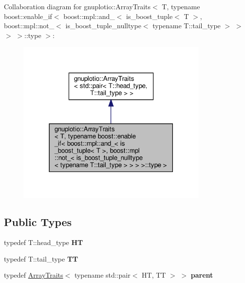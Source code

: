 Collaboration diagram for gnuplotio\+:\+:Array\+Traits$<$ T, typename boost\+:\+:enable\+\_\+if$<$ boost\+:\+:mpl\+:\+:and\+\_\+$<$ is\+\_\+boost\+\_\+tuple$<$ T $>$, boost\+:\+:mpl\+:\+:not\+\_\+$<$ is\+\_\+boost\+\_\+tuple\+\_\+nulltype$<$ typename T\+:\+:tail\+\_\+type $>$ $>$ $>$ $>$\+:\+:type $>$\+:
\nopagebreak
\begin{figure}[H]
\begin{center}
\leavevmode
\includegraphics[width=270pt]{classgnuplotio_1_1ArrayTraits_3_01T_00_01typename_01boost_1_1enable__if_3_01boost_1_1mpl_1_1and_5c5b3f7103a9f155bd15ec6df70697d0}
\end{center}
\end{figure}
\subsection*{Public Types}
\begin{DoxyCompactItemize}
\item 
\mbox{\label{classgnuplotio_1_1ArrayTraits_3_01T_00_01typename_01boost_1_1enable__if_3_01boost_1_1mpl_1_1and_371638f7d82cde4b7a8a064d0797371a_ab56761f05b74be318cc7becbc59348df}} 
typedef T\+::head\+\_\+type {\bfseries HT}
\item 
\mbox{\label{classgnuplotio_1_1ArrayTraits_3_01T_00_01typename_01boost_1_1enable__if_3_01boost_1_1mpl_1_1and_371638f7d82cde4b7a8a064d0797371a_a16316f598ab57b0b7ceea99dcd34632e}} 
typedef T\+::tail\+\_\+type {\bfseries TT}
\item 
\mbox{\label{classgnuplotio_1_1ArrayTraits_3_01T_00_01typename_01boost_1_1enable__if_3_01boost_1_1mpl_1_1and_371638f7d82cde4b7a8a064d0797371a_aad44f59a1d618b863442a9fdaa83d142}} 
typedef \hyperlink{classgnuplotio_1_1ArrayTraits}{Array\+Traits}$<$ typename std\+::pair$<$ HT, TT $>$ $>$ {\bfseries parent}
\end{DoxyCompactItemize}
